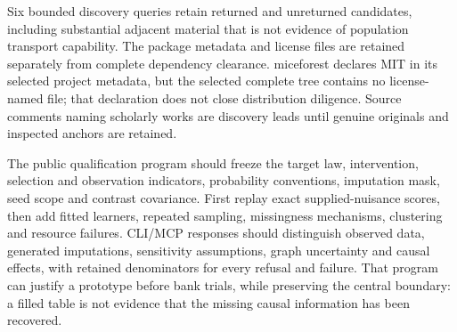 Six bounded discovery queries retain returned and unreturned candidates, including substantial adjacent material that is not evidence of population transport capability. The package metadata and license files are retained separately from complete dependency clearance. miceforest declares MIT in its selected project metadata, but the selected complete tree contains no license-named file; that declaration does not close distribution diligence. Source comments naming scholarly works are discovery leads until genuine originals and inspected anchors are retained.\citep{exec25_ptm_miceforest,exec25_ptm_choice}

The public qualification program should freeze the target law, intervention, selection and observation indicators, probability conventions, imputation mask, seed scope and contrast covariance. First replay exact supplied-nuisance scores, then add fitted learners, repeated sampling, missingness mechanisms, clustering and resource failures. CLI/MCP responses should distinguish observed data, generated imputations, sensitivity assumptions, graph uncertainty and causal effects, with retained denominators for every refusal and failure. That program can justify a prototype before bank trials, while preserving the central boundary: a filled table is not evidence that the missing causal information has been recovered.\citep{exec25_ptm_choice}
